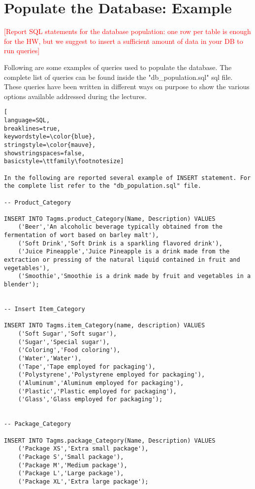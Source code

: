 
\section{Populate the Database: Example}
\textcolor{red}{[Report SQL statements for the database population: one row per table is enough for the HW, but we suggest to insert a sufficient amount of data in your DB to run queries]}

Following are some examples of queries used to populate the database. The complete list of queries can be found inside the "db\_population.sql" sql file. These queries have been written in different ways on purpose to show the various options available addressed during the lectures.


\begin{lstlisting}[
language=SQL,
breaklines=true,
keywordstyle=\color{blue},
stringstyle=\color{mauve},
showstringspaces=false,
basicstyle=\ttfamily\footnotesize]

In the following are reported several example of INSERT statement. For the complete list refer to the "db_population.sql" file.

-- Product_Category

INSERT INTO Tagms.product_Category(Name, Description) VALUES
    ('Beer','An alcoholic beverage typically obtained from the fermentation of wort based on barley malt'),
    ('Soft Drink','Soft Drink is a sparkling flavored drink'),
    ('Juice Pineapple','Juice Pineapple is a drink made from the extraction or pressing of the natural liquid contained in fruit and vegetables'),
    ('Smoothie','Smoothie is a drink made by fruit and vegetables in a blender');


-- Insert Item_Category

INSERT INTO Tagms.item_Category(name, description) VALUES
    ('Soft Sugar','Soft sugar'),
    ('Sugar','Special sugar'),
    ('Coloring','Food coloring'),
    ('Water','Water'),
    ('Tape','Tape employed for packaging'),
    ('Polystyrene','Polystyrene employed for packaging'),
    ('Aluminum','Aluminum employed for packaging'),
    ('Plastic','Plastic employed for packaging'),
    ('Glass','Glass employed for packaging');


-- Package_Category

INSERT INTO Tagms.package_Category(Name, Description) VALUES
    ('Package XS','Extra small package'),
    ('Package S','Small package'),
    ('Package M','Medium package'),
    ('Package L','Large package'),
    ('Package XL','Extra large package');



\end{lstlisting}
